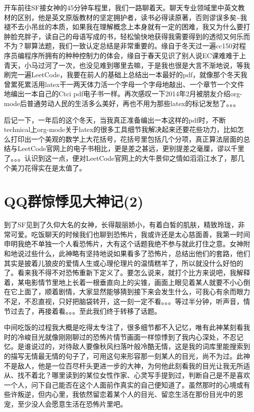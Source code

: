 \documentclass[12pt]{book}
\begin{document}
开车前往SF接女神的45分钟车程里，我们一路聊着天。聊天专业领域里中英文教材的区别，他是英文原版教材的坚定拥护者，读书必得读原著，否则谬误多矣\textasciitilde{}我褪不去小吊丝的本质，如果我在理解概念上本身就有一定的困难，我又为什么要打肿脸充胖子，读自己的母语写成的书，轻松愉快地获得我需要得到的透彻又何乐而不为？聊算法题，我们一致认定总结是非常重要的。缘自于冬天过一遍cc150对程序员编程序所拥有的种种控制力的体会，缘自于春天见识了别人说EC课难难于上青天，小马过河了一次，也没见难到哪里去嘛，于是我也很是大言不渐地说，等我刷完一遍LeetCode，我要在前人的基础上总结出一本最好的pdf，就像那个冬天我曾累死累活用latex干一两天体力活一个字母一个字母地敲出、一个章节一个文件地编出一本自己的Ctci pdf电子书一样。再次感叹一下2014年2月被朋友介绍org-mode后普通劳动人民的生活多么美好，再也不用为那些latex的标记发愁了。。。

后记一下，一年后的这个冬天，当我真正准备编出一本这样的pdf时，不断technical上org-mode关于latex的很多工具细节我解决起来还要花些功力，比如怎么打印出一个美观的数学上大花括号，花括号里包括几个分项，真正算法层面的总结与LeetCode官网上的电子书相比，更是差之甚远，更别提差之毫厘，谬以千里了。。。认识到这一点，便对LeetCode官网上的大牛景仰之情如滔滔江水了，那几个美刀花得实在是太值了。 

\section{QQ群惊悸见大神记(2)}
\label{sec-3-2}

到了SF见到了久仰大名的女神，长得靓丽娇小，有着白皙的肌肤，精致玲珑，非常可爱。吃饭聊天的时候我们也聊到恐怖片，我或许还是太心慈面善，我第一时间申明我绝不单独一个人看恐怖片，大有这个话题我绝不参与就此打住之意。女神附和地说过些什么，此神略有坚持地说如果看多了恐怖片，总结出他们的套路，他们其实是披着儿狼皮的爱情人生或心理伦理片的温情糕羊了，所以就没什么好怕的了。看来我不得不对恐怖重新下定义了。要怎么说来，就打个比方来说吧，我解释着，某电影情节里地上长着一根垂直向上的尖锥，画面上眼见着某人就要不小心倒在它上面了，顺着剧情，大家显然能够猜到接下来会发生什么，可我心有余而眼力不足，不忍直视，只好把脑袋转开，这一刻一定不看。。。等过半分钟，听声音，情节过去了，再接着看。。。至此我们终于转移了话题。

中间吃饭的过程我大概是吃得太专注了，很多细节都不入记忆，唯有此神某刻看我时的冷峻目光就像刚刚聊过的恐怖片情节画面一样惊悸到了我内心深处，不忍记忆。是谁说过的，对待敌人要像秋风扫落叶般冷酷无情，这是我的词库里能搜索到的描写无情最无情的句子了，可用这句来形容那一刻某人的目光，尚不为过。此神不是敌人，他是一位百尽杆头更进一步的大神，为何他此刻看我的目光让我无所适从、找不着北？哪里读到的某位女性作家、心灵写手提到过，判断自己是不是喜欢一个人，问下自己能否在这个人面前作真实的自己便知道了。虽然那时的心境或有些许叛逆，但内心里，我依然留恋着某个人的目光、留恋生活在那份目光中的恩宠，至少没人会愿意生活在恐怖片里吧。
\end{document}

